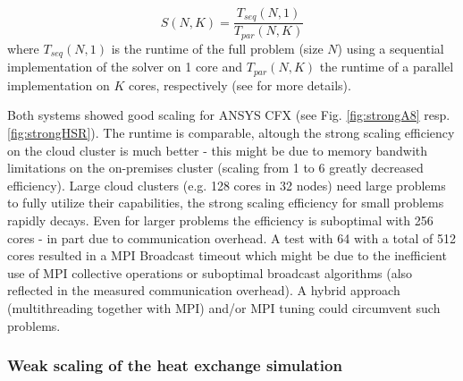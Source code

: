 \documentclass[3p,times]{elsarticle}
\begin{document}
\begin{equation}
\label{eq:speedup}
S(N,K) = \frac{T_{seq}(N,1)}{T_{par}(N,K)}
\end{equation}
where $T_{seq}(N,1)$ is the runtime of the full problem (size $N$) using a sequential implementation of the solver on 1 core and $T_{par}(N,K)$ the runtime of a parallel implementation on $K$ cores, respectively (see \cite{kaminsky15} for more details).


Both systems showed good scaling for ANSYS	 CFX (see Fig. \ref{fig:strongA8} resp. \ref{fig:strongHSR}). The runtime is comparable, altough the strong scaling efficiency on the cloud cluster is much better - this might be due to memory bandwith limitations on the on-premises cluster (scaling from 1 to 6 greatly decreased efficiency).  Large cloud clusters (e.g. 128 cores in 32 nodes) need large problems to fully utilize their capabilities, the strong scaling efficiency for small problems rapidly decays. Even for larger problems the efficiency is suboptimal with 256 cores - in part due to communication overhead. 
A test with 64 with a total of 512 cores resulted in a MPI Broadcast timeout which might be due to the inefficient use of MPI collective operations or suboptimal broadcast algorithms (also reflected in the measured communication overhead). A hybrid approach (multithreading together with MPI) and/or MPI tuning could circumvent such problems.

 
\subsubsection{Weak scaling of the heat exchange simulation}
\end{document}
